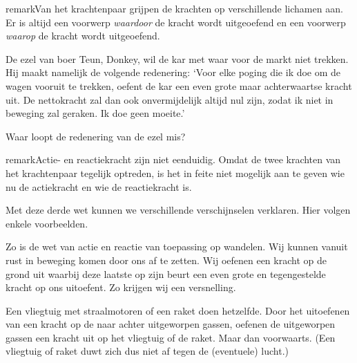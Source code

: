 \documentclass{ximera}
\begin{document}
\begin{expandable}{remark}{Van het krachtenpaar grijpen de krachten op verschillende lichamen aan.}
	Er is altijd een voorwerp \emph{waardoor} de kracht wordt uitgeoefend en een voorwerp \emph{waarop} de kracht wordt uitgeoefend.

	\begin{denkvraag*}{}%
		De ezel van boer Teun, Donkey, wil de kar met waar voor de markt niet trekken. Hij maakt namelijk de volgende redenering: `Voor elke poging die ik doe om de wagen vooruit te trekken, oefent de kar een even grote maar achterwaartse kracht uit. De nettokracht zal dan ook onvermijdelijk altijd nul zijn, zodat ik niet in beweging zal geraken. Ik doe geen moeite.'

		Waar loopt de redenering van de ezel mis?
	\end{denkvraag*}

\end{expandable}

\begin{expandable}{remark}{Actie- en reactiekracht zijn niet eenduidig.}
	Omdat de twee krachten van het krachtenpaar tegelijk optreden, is het in feite niet mogelijk aan te geven wie nu de actiekracht en wie de reactiekracht is.
\end{expandable}

Met deze derde wet kunnen we verschillende verschijnselen verklaren. Hier volgen enkele voorbeelden.

\begin{example} \nl
	Zo is de wet van actie en reactie van toepassing op wandelen. Wij kunnen vanuit rust in beweging komen door ons af te zetten. Wij oefenen een kracht op de grond uit waarbij deze laatste op zijn beurt een even grote en tegengestelde kracht op ons uitoefent. Zo krijgen wij een versnelling. 

\end{example}

\begin{example}\nl
	Een vliegtuig met straalmotoren of een raket doen hetzelfde. Door het uitoefenen van een kracht op de naar achter uitgeworpen gassen, oefenen de uitgeworpen gassen een kracht uit op het vliegtuig of de raket. Maar dan voorwaarts. (Een vliegtuig of raket duwt zich dus niet af tegen de (eventuele) lucht.)
\end{example}
\end{document}
